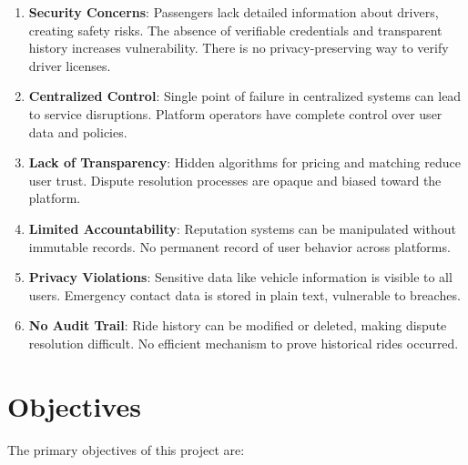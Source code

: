 \begin{enumerate}
    \item \textbf{Security Concerns}: Passengers lack detailed information about drivers, creating safety risks. The absence of verifiable credentials and transparent history increases vulnerability. There is no privacy-preserving way to verify driver licenses.
    
    \item \textbf{Centralized Control}: Single point of failure in centralized systems can lead to service disruptions. Platform operators have complete control over user data and policies.
    
    \item \textbf{Lack of Transparency}: Hidden algorithms for pricing and matching reduce user trust. Dispute resolution processes are opaque and biased toward the platform.
    
    \item \textbf{Limited Accountability}: Reputation systems can be manipulated without immutable records. No permanent record of user behavior across platforms.
    
    \item \textbf{Privacy Violations}: Sensitive data like vehicle information is visible to all users. Emergency contact data is stored in plain text, vulnerable to breaches.
    
    \item \textbf{No Audit Trail}: Ride history can be modified or deleted, making dispute resolution difficult. No efficient mechanism to prove historical rides occurred.
\end{enumerate}

\section{Objectives}

The primary objectives of this project are:

